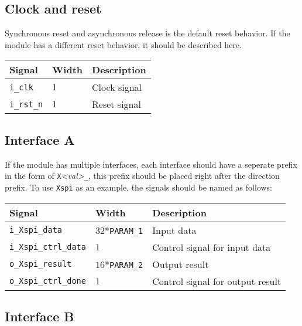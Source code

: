 \documentclass[a4paper, oneside]{report}
\begin{document}
            \subsection{Clock and reset}
                Synchronous reset and asynchronous release is the default reset behavior. If the module has a different reset behavior, it should be described here.
                \begin{longtable}{lll}
                    \toprule
                    \textbf{Signal}      & \textbf{Width}    & \textbf{Description} \\
                    \midrule
                    \texttt{i\_clk}      & $1$                 & Clock signal \\
                    \texttt{i\_rst\_n}   & $1$                 & Reset signal \\
                    \bottomrule
                \end{longtable}
            \subsection{Interface A}
                If the module has multiple interfaces, each interface should have a seperate prefix in the form of \texttt{X}\textit{<val>}\texttt{\_}, this prefix should be placed right after the direction prefix. To use \texttt{Xspi} as an example, the signals should be named as follows:
                \begin{longtable}{lll}
                    \toprule
                    \textbf{Signal}      & \textbf{Width}    & \textbf{Description} \\
                    \midrule
                    \texttt{i\_Xspi\_data}      & $32$*\texttt{PARAM\_1}         & Input data \\
                    \texttt{i\_Xspi\_ctrl\_data}& $1$                            & Control signal for input data \\
                    \texttt{o\_Xspi\_result}    & $16$*\texttt{PARAM\_2}         & Output result \\
                    \texttt{o\_Xspi\_ctrl\_done}& $1$                            & Control signal for output result \\
                    \bottomrule
                \end{longtable}
            \subsection{Interface B}
        
\end{document}
